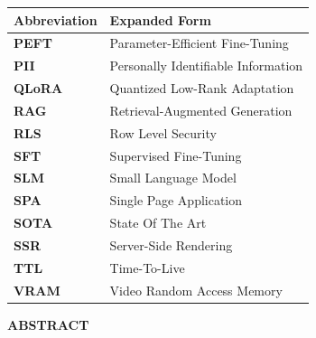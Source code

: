 \documentclass[12pt, a4paper]{report}
\begin{document}
\newpage
\begin{table}[h!]
    \centering
    \normalsize
    \renewcommand{\arraystretch}{1.5}
    \begin{tabularx}{\textwidth}{Z{0.44} | Z{1.56}}
        \textbf{Abbreviation} & \textbf{Expanded Form} \\ \hline
        \textbf{PEFT} & Parameter-Efficient Fine-Tuning \\
        \textbf{PII} & Personally Identifiable Information \\
        \textbf{QLoRA} & Quantized Low-Rank Adaptation \\
        \textbf{RAG} & Retrieval-Augmented Generation \\
        \textbf{RLS} & Row Level Security \\
        \textbf{SFT} & Supervised Fine-Tuning \\
        \textbf{SLM} & Small Language Model \\
        \textbf{SPA} & Single Page Application \\
        \textbf{SOTA} & State Of The Art \\
        \textbf{SSR} & Server-Side Rendering \\
        \textbf{TTL} & Time-To-Live \\
        \textbf{VRAM} & Video Random Access Memory \\
    \end{tabularx}
\end{table}

\newpage
\tableofcontents

\newpage
{}
\listoftables

\newpage
{}
\listoffigures

\newpage
{}
\begin{center}
    {\LARGE \textbf{ABSTRACT}\par}
\end{center}
\vspace{1cm}
\end{document}
